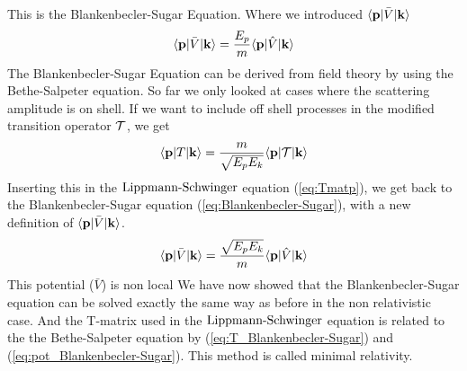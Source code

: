 %
This is the Blankenbecler-Sugar Equation. Where we introduced $\langle{\bf p}|\bar{V}|{\bf k}\rangle$
\begin{equation}
\langle{\bf p}|\bar{V}|{\bf k}\rangle=\frac{{E_p}}{m}\langle{\bf p}|\hat{V}|{\bf k}\rangle
\end{equation} 
%
The Blankenbecler-Sugar Equation can be derived from field theory by using the Bethe-Salpeter equation. So far we only looked at cases where
the scattering amplitude is on shell. If we want to include off shell processes in the modified transition operator ${\cal T}$, we get
\begin{equation}\label{eq:T_Blankenbecler-Sugar}  
\braketm{{\bf p}}{T}{{\bf k}}=\frac{m}{{\sqrt{E_pE_k}}}\braketm{{\bf p}}{{\cal{T}}}{{\bf k}}
\end{equation}
%
Inserting this in the $\text{Lippmann-Schwinger}$ equation (\ref{eq:Tmatp}), we get back to  the Blankenbecler-Sugar equation (\ref{eq:Blankenbecler-Sugar}),
with a new definition of $\langle{\bf p}|\bar{V}|{\bf k}\rangle$.
\begin{equation}\label{eq:pot_Blankenbecler-Sugar} 
\braketm{{\bf p}} {\bar{V}}{{\bf k}}=\frac{{\sqrt{E_pE_k}}}{m}\braketm{{\bf p}} {\op{V}}{{\bf k}}
\end{equation}
%
This potential ($\bar{V}$) is non local %
We have now showed that the Blankenbecler-Sugar equation can be solved exactly the same way as before in the non relativistic case. 
And the T-matrix used in the $\text{Lippmann-Schwinger}$ equation is related to the the Bethe-Salpeter equation by 
(\ref{eq:T_Blankenbecler-Sugar}) and (\ref{eq:pot_Blankenbecler-Sugar}). This method is called minimal relativity.


